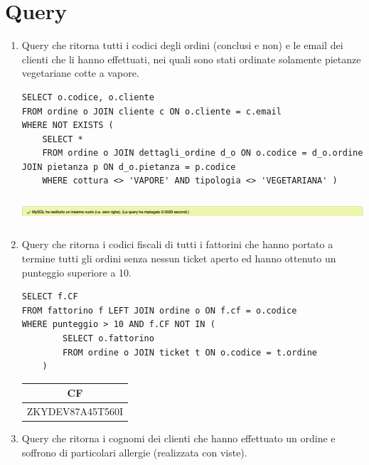 \documentclass[10pt]{article}
\begin{document}
	\section{Query}
	\begin{enumerate}[noitemsep]
		\item Query che ritorna tutti i codici degli ordini (conclusi e non) e le email dei clienti che li hanno effettuati, nei quali sono stati ordinate solamente pietanze vegetariane cotte a vapore.
\begin{lstlisting}[style=Mysql]
SELECT o.codice, o.cliente
FROM ordine o JOIN cliente c ON o.cliente = c.email
WHERE NOT EXISTS (
	SELECT *
	FROM ordine o JOIN dettagli_ordine d_o ON o.codice = d_o.ordine JOIN pietanza p ON d_o.pietanza = p.codice
	WHERE cottura <> 'VAPORE' AND tipologia <> 'VEGETARIANA' )
\end{lstlisting}
\begin{center}
\hspace*{-1cm}
\includegraphics[width=19cm, height=1cm]{query1.png}
\hspace*{-1cm}
\end{center}
	\item Query che ritorna i codici fiscali di tutti i fattorini che hanno portato a termine tutti gli ordini senza nessun ticket aperto ed hanno ottenuto un punteggio superiore a 10.
\begin{lstlisting}[style=Mysql]
SELECT f.CF
FROM fattorino f LEFT JOIN ordine o ON f.cf = o.codice 
WHERE punteggio > 10 AND f.CF NOT IN (
    	SELECT o.fattorino
    	FROM ordine o JOIN ticket t ON o.codice = t.ordine
    )
\end{lstlisting}	
\begin{center}
	\begin{table}[H]
		\centering
		\label{table:query2}
		\begin{tabular}{|c|}
			\hline
			\textbf{CF} \\ \hline
			ZKYDEV87A45T560I \\ \hline
		\end{tabular}
	\end{table}
\end{center}
	\item Query che ritorna i cognomi dei clienti che hanno effettuato un ordine e soffrono di particolari allergie (realizzata con viste).
	\begin{lstlisting}[style=Mysql]

\end{lstlisting}
\end{enumerate}
\end{document}
